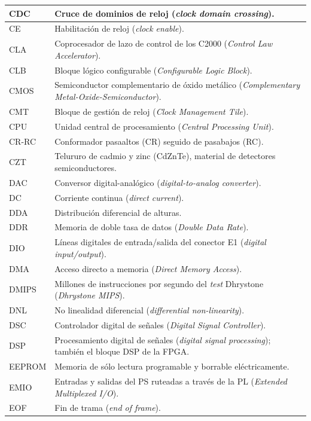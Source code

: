 {\begin{longtable}{|>{\raggedright\arraybackslash}p{}%
  |>{\raggedright\arraybackslash}p{}|}
CDC & Cruce de dominios de reloj (\emph{clock domain crossing}). \\ \hline
CE & Habilitación de reloj (\emph{clock enable}). \\ \hline
CLA & Coprocesador de lazo de control de los C2000 (\emph{Control Law Accelerator}). \\ \hline
CLB & Bloque lógico configurable (\emph{Configurable Logic Block}). \\ \hline
CMOS & Semiconductor complementario de óxido metálico (\emph{Complementary Metal-Oxide-Semiconductor}). \\ \hline
CMT & Bloque de gestión de reloj (\emph{Clock Management Tile}). \\ \hline
CPU & Unidad central de procesamiento (\emph{Central Processing Unit}). \\ \hline
CR-RC & Conformador pasaaltos (CR) seguido de pasabajos (RC). \\ \hline
CZT & Telururo de cadmio y zinc (CdZnTe), material de detectores semiconductores. \\ \hline
DAC & Conversor digital-analógico (\emph{digital-to-analog converter}). \\ \hline
DC & Corriente continua (\emph{direct current}). \\ \hline
DDA & Distribución diferencial de alturas. \\ \hline
DDR & Memoria de doble tasa de datos (\emph{Double Data Rate}). \\ \hline
DIO & Líneas digitales de entrada/salida del conector E1 (\emph{digital input/output}). \\ \hline
DMA & Acceso directo a memoria (\emph{Direct Memory Access}). \\ \hline
DMIPS & Millones de instrucciones por segundo del \emph{test} Dhrystone (\emph{Dhrystone MIPS}). \\ \hline
DNL & No linealidad diferencial (\emph{differential non-linearity}). \\ \hline
DSC & Controlador digital de señales (\emph{Digital Signal Controller}). \\ \hline
DSP & Procesamiento digital de señales (\emph{digital signal processing}); también el bloque DSP de la FPGA. \\ \hline
EEPROM & Memoria de sólo lectura programable y borrable eléctricamente. \\ \hline
EMIO & Entradas y salidas del PS ruteadas a través de la PL (\emph{Extended Multiplexed I/O}). \\ \hline
EOF & Fin de trama (\emph{end of frame}). \\ \hline

\end{longtable}}
